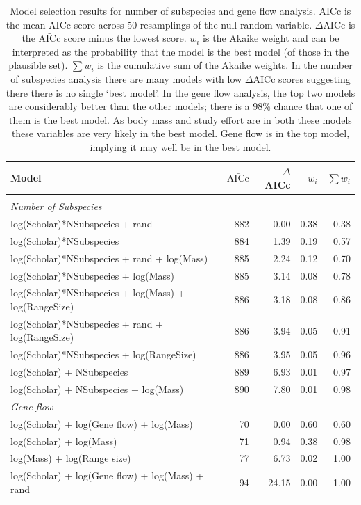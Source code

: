 \begin{table}[t]
\centering
\caption[Model selection results for number of subspecies analysis]{
Model selection results for number of subspecies and gene flow analysis. 
$\bar{\text{AICc}}$ is the mean AICc score across 50 resamplings of the null random variable. 
$\Delta$AICc is the $\bar{\text{AICc}}$ score minus the lowest score. 
$w_i$ is the Akaike weight and can be interpreted as the probability that the model is the best model (of those in the plausible set).
$\sum w_i$ is the cumulative sum of the Akaike weights.
In the number of subspecies analysis there are many models with low $\Delta$AICc scores suggesting there there is no single `best model'.
In the gene flow analysis, the top two models are considerably better than the other models; there is a 98\% chance that one of them is the best model.
As body mass and study effort are in both these models these variables are very likely in the best model.
Gene flow is in the top model, implying it may well be in the best model.
}

\begin{tabular}{@{}>{\small}lrrrr@{}}

\toprule
\normalsize{Model} & $\bar{\text{AICc}}$ & $\Delta$AICc & $w_i$ & $\sum w_i$\\
\midrule
&&&&\\[-3mm]
\textit{Number of Subspecies} &&&&\\
log(Scholar)*NSubspecies + rand & 
882 & 0.00 &
0.38 & 0.38\\
log(Scholar)*NSubspecies & 
884 & 1.39 &
0.19 & 0.57\\
log(Scholar)*NSubspecies + rand + log(Mass) & 
885 & 2.24 &
0.12 & 0.70\\
log(Scholar)*NSubspecies  + log(Mass) & 
885 & 3.14 &
0.08 & 0.78\\
log(Scholar)*NSubspecies  + log(Mass) + log(RangeSize) & 
886 & 3.18 &
0.08 & 0.86\\
log(Scholar)*NSubspecies  + rand + log(RangeSize) & 
886 & 3.94 &
0.05 & 0.91\\
log(Scholar)*NSubspecies  + log(RangeSize) & 
886 & 3.95 &
0.05 & 0.96\\
log(Scholar) + NSubspecies & 
889 & 6.93 &
0.01 & 0.97\\
log(Scholar) + NSubspecies + log(Mass) & 
890 & 7.80 &
0.01 & 0.98\\[2mm]
\textit{Gene flow} &&&&\\
log(Scholar) + log(Gene flow) + log(Mass) & 
70 & 0.00 &
0.60 & 0.60\\
log(Scholar) + log(Mass) & 
71 & 0.94 &
0.38 & 0.98\\
log(Mass) + log(Range size) & 
77 & 6.73 &
0.02 & 1.00\\
log(Scholar) + log(Gene flow) + log(Mass) + rand &
94 & 24.15 &
0.00 & 1.00\\
\bottomrule
\end{tabular}

\label{t:subsmodels}
\end{table}

